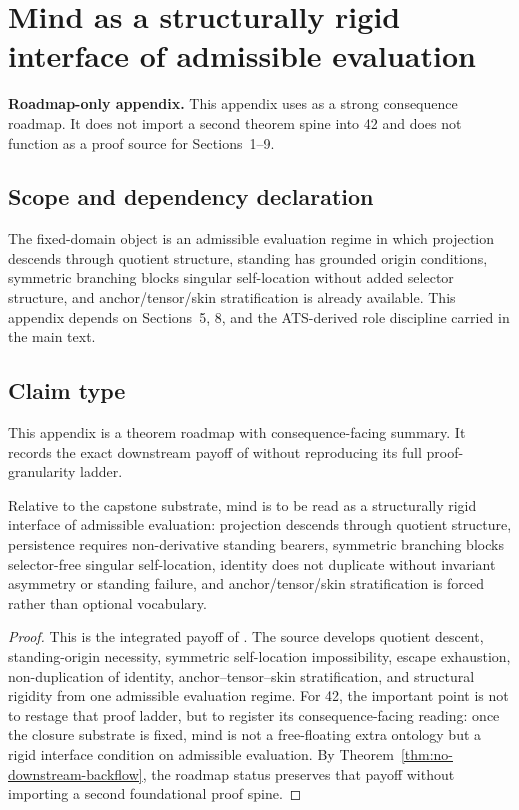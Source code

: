 \section{Mind as a structurally rigid interface of admissible evaluation}
\label{app:mind}

\begin{fixedbox}
\textbf{Roadmap-only appendix.} This appendix uses \minddoc{} as a strong consequence roadmap. It does not import a second theorem spine into 42 and does not function as a proof source for Sections~1--9.
\end{fixedbox}

\subsection*{Scope and dependency declaration}
The fixed-domain object is an admissible evaluation regime in which projection descends through quotient structure, standing has grounded origin conditions, symmetric branching blocks singular self-location without added selector structure, and anchor/tensor/skin stratification is already available. This appendix depends on Sections~5, 8, and the ATS-derived role discipline carried in the main text.

\subsection*{Claim type}
This appendix is a theorem roadmap with consequence-facing summary. It records the exact downstream payoff of \minddoc{} without reproducing its full proof-granularity ladder.

\begin{proposition}
Relative to the capstone substrate, mind is to be read as a structurally rigid interface of admissible evaluation: projection descends through quotient structure, persistence requires non-derivative standing bearers, symmetric branching blocks selector-free singular self-location, identity does not duplicate without invariant asymmetry or standing failure, and anchor/tensor/skin stratification is forced rather than optional vocabulary.
\end{proposition}

\begin{proof}
This is the integrated payoff of \minddoc{}. The source develops quotient descent, standing-origin necessity, symmetric self-location impossibility, escape exhaustion, non-duplication of identity, anchor--tensor--skin stratification, and structural rigidity from one admissible evaluation regime. For 42, the important point is not to restage that proof ladder, but to register its consequence-facing reading: once the closure substrate is fixed, mind is not a free-floating extra ontology but a rigid interface condition on admissible evaluation. By Theorem~\ref{thm:no-downstream-backflow}, the roadmap status preserves that payoff without importing a second foundational proof spine.\cite{MaleyMindRigidInterface}
\end{proof}

